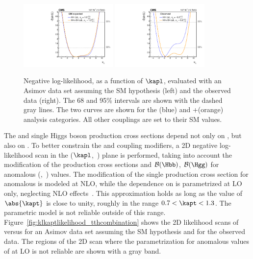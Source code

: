 \documentclass[11pt,a4paper,cmspaper,final,collab]{cms-tdr}
\begin{document}
\begin{figure}[!htb]
  \centering
\includegraphics[width=0.43\textwidth]{Figure_011-a.pdf} 
\includegraphics[width=0.43\textwidth]{Figure_011-b.pdf} 
  \caption{Negative log-likelihood, as a function of $\kapl$, evaluated with an Asimov data set assuming the SM hypothesis (left) and the observed data (right).
 The 68 and 95\% \CL intervals are shown with the dashed gray lines.
 The two curves are shown for the \HH (blue) and \HH+\ttH (orange) analysis categories. All other couplings are set to their SM values.}
\label{fig:kllikelihood}
\end{figure}

The \HH and single Higgs boson production cross sections depend not only on \kapl, but also on \kapt. To better constrain the \kapl and \kapt coupling modifiers, a 2D negative log-likelihood scan in the ($\kapl$,~\kapt) plane is performed, taking into account the modification of the production cross sections and $\mathcal{B}(\Hbb)$, $\mathcal{B}(\Hgg)$ for anomalous (\kapl,~\kapt) values. The modification of the single \PH production cross section for anomalous \kapl is modeled at NLO, while the dependence on \kapt is parametrized at LO only, neglecting NLO effects~\cite{Maltoni:2017ims}. This approximation holds as long as the value of $\abs{\kapt}$ is close to unity, roughly in the range $ 0.7<\kapt<1.3 $. The parametric model is not reliable outside of this range. 
Figure~\ref{fig:klkaptlikelihood_tthcombination} shows the 2D likelihood scans of \kapl versus \kapt for an Asimov data set assuming the SM hypothesis and for the observed data.
 The regions of the 2D scan where the \kapt parametrization for anomalous values of \kapl at LO is not reliable are shown with a gray band.
\end{document}
